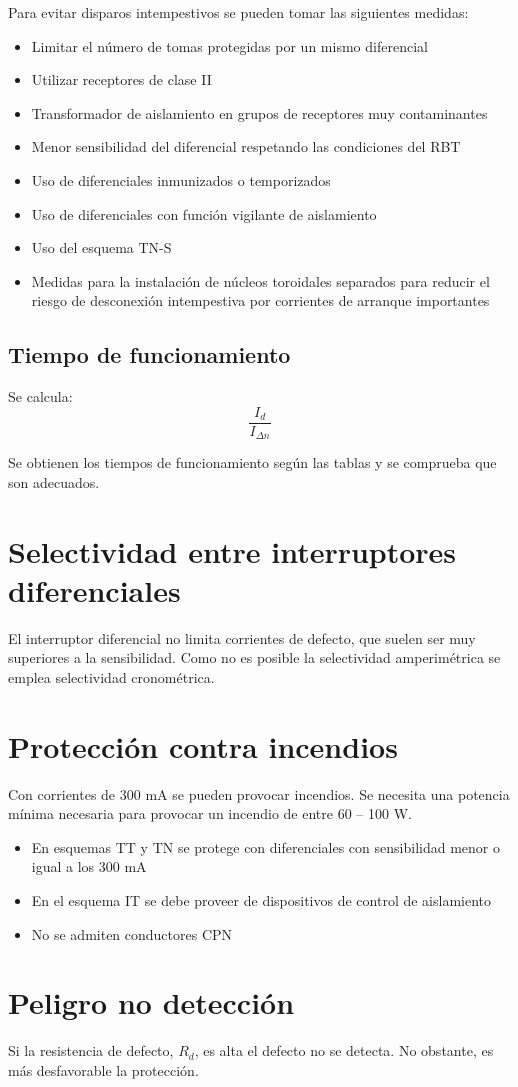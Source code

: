 Para evitar disparos intempestivos se pueden tomar las siguientes medidas:
\begin{itemize}
	\item Limitar el número de tomas protegidas por un mismo diferencial
	\item Utilizar receptores de clase II
	\item Transformador de aislamiento en grupos de receptores muy contaminantes
	\item Menor sensibilidad del diferencial respetando las condiciones del RBT
	\item Uso de diferenciales inmunizados o temporizados
	\item Uso de diferenciales con función vigilante de aislamiento
	\item Uso del esquema TN-S
	\item Medidas para la instalación de núcleos toroidales separados para reducir el riesgo de desconexión intempestiva por corrientes de arranque importantes
\end{itemize}
\subsection{Tiempo de funcionamiento}
Se calcula:
\begin{equation}
	\dfrac{I_d}{I_{\Delta n}}
\end{equation}

Se obtienen los tiempos de funcionamiento según las tablas y se comprueba que son adecuados.
\section{Selectividad entre interruptores diferenciales}
El interruptor diferencial no limita corrientes de defecto, que suelen ser muy superiores a la sensibilidad. Como no es posible la selectividad amperimétrica se emplea selectividad cronométrica.
\section{Protección contra incendios}
Con corrientes de 300 mA se pueden provocar incendios. Se necesita una potencia mínima necesaria para provocar un incendio de entre 60 – 100 W.
\begin{itemize}
	\item En esquemas TT y TN se protege con diferenciales con sensibilidad menor o igual a los 300 mA
	\item En el esquema IT se debe proveer de dispositivos de control de aislamiento
	\item No se admiten conductores CPN
\end{itemize}
\section{Peligro no detección}
Si la resistencia de defecto, $R_d$, es alta el defecto no se detecta. No obstante, es más desfavorable la protección.